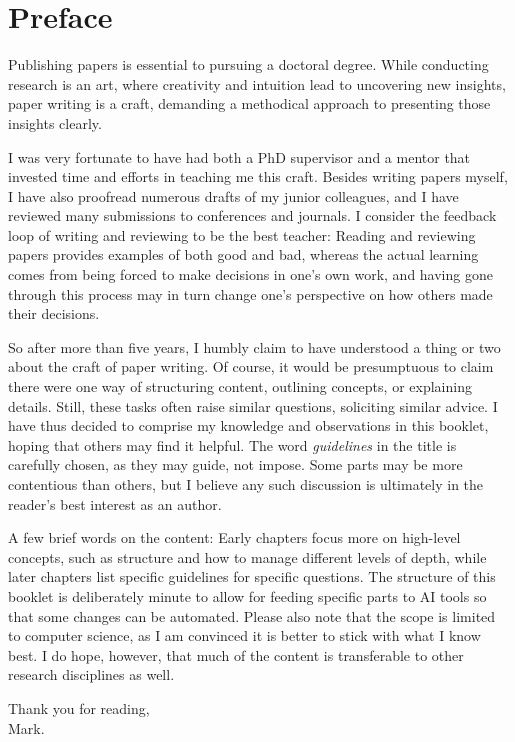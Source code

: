 \chapter*{Preface}

Publishing papers is essential to pursuing a doctoral degree.
While conducting research is an art, where creativity and intuition lead to uncovering new insights, paper writing is a craft, demanding a methodical approach to presenting those insights clearly.

I was very fortunate to have had both a PhD supervisor and a mentor that invested time and efforts in teaching me this craft.
Besides writing papers myself, I have also proofread numerous drafts of my junior colleagues, and I have reviewed many submissions to conferences and journals.
I consider the feedback loop of writing and reviewing to be the best teacher:
Reading and reviewing papers provides examples of both good and bad, whereas the actual learning comes from being forced to make decisions in one's own work, and having gone through this process may in turn change one's perspective on how others made their decisions.

So after more than five years, I humbly claim to have understood a thing or two about the craft of paper writing.
Of course, it would be presumptuous to claim there were one way of structuring content, outlining concepts, or explaining details.
Still, these tasks often raise similar questions, soliciting similar advice.
I have thus decided to comprise my knowledge and observations in this booklet, hoping that others may find it helpful.
The word \emph{guidelines} in the title is carefully chosen, as they may guide, not impose.
Some parts may be more contentious than others, but I believe any such discussion is ultimately in the reader's best interest as an author.

A few brief words on the content:
Early chapters focus more on high-level concepts, such as structure and how to manage different levels of depth, while later chapters list specific guidelines for specific questions.
The structure of this booklet is deliberately minute to allow for feeding specific parts to AI tools so that some changes can be automated.
Please also note that the scope is limited to computer science, as I am convinced it is better to stick with what I know best.
I do hope, however, that much of the content is transferable to other research disciplines as well.

\bigskip

\noindent Thank you for reading, \\
\noindent Mark.
